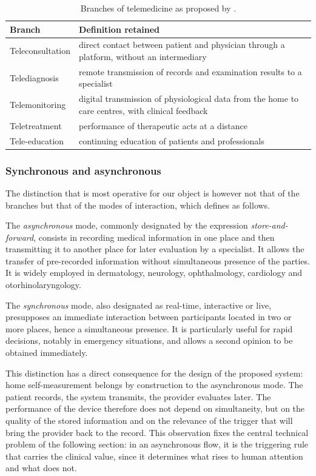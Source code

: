 \documentclass[12pt,a4paper,oneside]{report}
\begin{document}
\begin{table}[htbp]
\centering\small
\caption{Branches of telemedicine as proposed by \textcite{navarro2023}.}\label{tab:branches}
\begin{tabularx}{\textwidth}{@{}>{\raggedright\arraybackslash}p{3.1cm} X@{}}
\toprule
\textbf{Branch} & \textbf{Definition retained} \\
\midrule
Teleconsultation & direct contact between patient and physician through a platform, without an intermediary \\
Telediagnosis & remote transmission of records and examination results to a specialist \\
Telemonitoring & digital transmission of physiological data from the home to care centres, with clinical feedback \\
Teletreatment & performance of therapeutic acts at a distance \\
Tele-education & continuing education of patients and professionals \\
\bottomrule
\end{tabularx}
\end{table}

\subsubsection{Synchronous and asynchronous}

The distinction that is most operative for our object is however not that of the branches but that of the modes of interaction, which \textcite{navarro2023} defines as follows.

The \emph{asynchronous} mode, commonly designated by the expression \emph{store-and-forward}, consists in recording medical information in one place and then transmitting it to another place for later evaluation by a specialist. It allows the transfer of pre-recorded information without simultaneous presence of the parties. It is widely employed in dermatology, neurology, ophthalmology, cardiology and otorhinolaryngology.

The \emph{synchronous} mode, also designated as real-time, interactive or live, presupposes an immediate interaction between participants located in two or more places, hence a simultaneous presence. It is particularly useful for rapid decisions, notably in emergency situations, and allows a second opinion to be obtained immediately.

This distinction has a direct consequence for the design of the proposed system: home self-measurement belongs by construction to the asynchronous mode. The patient records, the system transmits, the provider evaluates later. The performance of the device therefore does not depend on simultaneity, but on the quality of the stored information and on the relevance of the trigger that will bring the provider back to the record. This observation fixes the central technical problem of the following section: in an asynchronous flow, it is the triggering rule that carries the clinical value, since it determines what rises to human attention and what does not.
\end{document}
